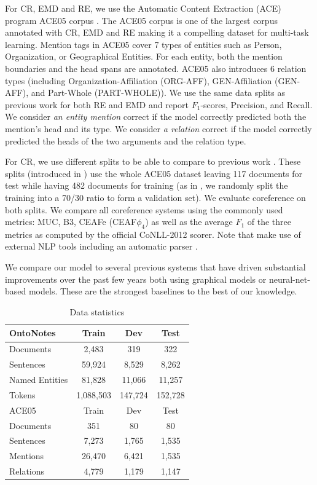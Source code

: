 \documentclass[letterpaper]{article}
\begin{document}
For CR, EMD and RE, we use the Automatic Content Extraction (ACE) program ACE05 corpus \cite{ACE05}. The ACE05 corpus is one of the largest corpus annotated with CR, EMD and RE making it a compelling dataset for multi-task learning. Mention tags in ACE05 cover 7 types of entities such as Person, Organization, or Geographical Entities. For each entity, both the mention boundaries and the head spans are annotated. ACE05 also introduces 6 relation types (including Organization-Affiliation (ORG-AFF), GEN-Affiliation (GEN-AFF), and Part-Whole (PART-WHOLE)). We use the same data splits as previous work \cite{Li2014,Miwa2016,Katiyar2017} for both RE and EMD and report $F_{1}$-scores, Precision, and Recall. We consider \textit{an entity mention} correct if the model correctly predicted both the mention's head and its type. We consider \textit{a relation} correct if the model correctly predicted the heads of the two arguments and the relation type.

For CR, we use different splits to be able to compare to previous work \cite{Bansal2012,Durrett2014}. These splits (introduced in \cite{Rahman2009}) use the whole ACE05 dataset leaving 117 documents for test while having 482 documents for training (as in \cite{Bansal2012}, we randomly split the training into a 70/30 ratio to form a validation set). We evaluate coreference on both splits. We compare all  coreference systems using the commonly used metrics: MUC, B3, CEAFe (CEAF$\phi_4$) as well as the average $F_{1}$ of the three metrics as computed by the official CoNLL-2012 scorer. Note that \citeauthor{Durrett2014} make use of external NLP tools including an automatic parser \cite{Durrett13easyvictories}.

We compare our model to several previous systems that have driven substantial improvements over the past few years both using graphical models or neural-net-based models. These are the strongest baselines to the best of our knowledge.

\begin{table}
  \caption{Data statistics}
  \label{ontonotes_statistics}
  \centering
  \begin{tabular}{lccc}
    \hline
    OntoNotes & Train & Dev & Test \\
    \hline
    Documents & 2,483 & 319 & 322 \\
    Sentences & 59,924 & 8,529 & 8,262 \\
    Named Entities & 81,828 & 11,066 & 11,257 \\
    Tokens & 1,088,503 & 147,724 & 152,728 \\
    \hline
    ACE05 & Train & Dev & Test \\
    \hline
    Documents & 351 & 80 & 80 \\
    Sentences & 7,273 & 1,765 & 1,535 \\
    Mentions & 26,470 & 6,421 & 1,535 \\
    Relations & 4,779 & 1,179 & 1,147 \\
    \hline
  \end{tabular}
\end{table}
\end{document}
